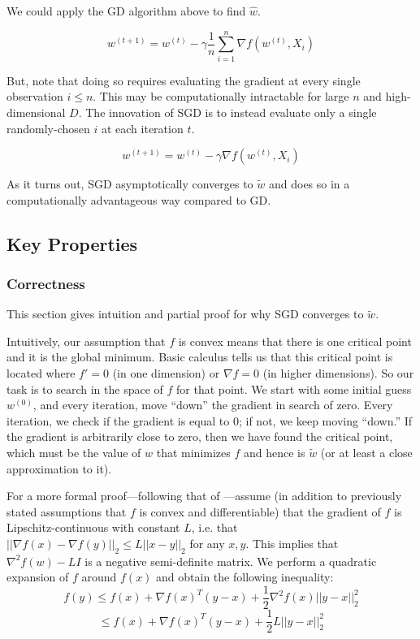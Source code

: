 \documentclass{article}
\begin{document}
We could apply the GD algorithm above to find $\hat{w}$.

\begin{equation}
	w^{(t+1)} = w^{(t)} - \gamma \frac{1}{n} \sum_{i=1}^n \nabla f(w^{(t)},
	X_i)
\end{equation}

But, note that doing so requires evaluating the gradient at every single
observation $i \leq n$. This may be computationally intractable for large $n$
and high-dimensional $D$. The innovation of SGD is to instead evaluate only a
single randomly-chosen $i$ at each iteration $t$.

\begin{equation}
	w^{(t+1)} = w^{(t)} - \gamma \nabla f(w^{(t)}, X_i)
\end{equation}

As it turns out, SGD asymptotically converges to $\tilde{w}$ and does so in a computationally
advantageous way compared to GD.

\subsection{Key Properties}

\subsubsection{Correctness}

This section gives intuition and partial proof for why SGD converges to
$\tilde{w}$.

Intuitively, our assumption that $f$ is convex means that there is one critical
point and it is the global minimum. Basic calculus tells us that this critical
point is located where $f'=0$ (in one dimension) or $\nabla f = 0$ (in higher
dimensions). So our task is to search in the space of $f$ for that point. We
start with some initial guess $w^{(0)}$, and every iteration, move ``down'' the
gradient in search of zero. Every iteration, we check if the gradient is equal
to 0; if not, we keep moving ``down.'' If the gradient is arbitrarily close to
zero, then we have found the critical point, which must be the value of $w$ that
minimizes $f$ and hence is $\tilde{w}$ (or at least a close approximation to it).

For a more formal proof---following that of \cite{tibs_notes}---assume (in addition to previously stated assumptions
that $f$ is convex and differentiable) that the gradient of $f$ is Lipschitz-continuous
with constant $L$, i.e. that $||\nabla f(x) - \nabla f(y)||_2 \leq L||x-y||_2$
for any $x, y$. This implies that $\nabla^2 f(w) - LI$ is a negative
semi-definite matrix. We perform a quadratic expansion of $f$ around $f(x)$ and
obtain the following inequality:
$$
f(y) \leq f(x) + \nabla f(x)^T(y-x) + \frac{1}{2}\nabla^2 f(x)||y-x||_2^2
$$
\begin{equation}
	\leq f(x) + \nabla f(x)^T(y-x) + \frac{1}{2}L||y-x||_2^2
\end{equation}
\end{document}
